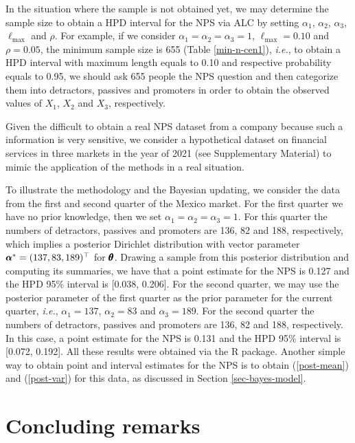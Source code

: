 \documentclass[12pt,a4paper]{article}%
\newcommand*{\bff}[1]{\ifmmode\pmb{#1}\else\textbf{#1}\fi}
\begin{document}
In the situation where the sample is not obtained yet, we may determine the sample size to obtain a HPD interval for the NPS via ALC by setting $\alpha_1$, $\alpha_2$, $\alpha_3$, $\ell_{\text{max}}$ and $\rho$. For example, if we consider $\alpha_1=\alpha_2=\alpha_3=1$, $\ell_{\text{max}}=0.10$ and $\rho=0.05$, the minimum sample size is 655 (Table \ref{min-n-cen1}), {\it i.e.}, to obtain a HPD interval with maximum length equals to 0.10 and respective probability equals to 0.95, we should ask 655 people the NPS question and then categorize them into detractors, passives and promoters in order to obtain the observed values of $X_1$, $X_2$ and $X_3$, respectively.

Given the difficult to obtain a real NPS dataset from a company because such a information is very sensitive, we consider a hypothetical dataset on financial services in three markets in the year of 2021 (see Supplementary Material) to mimic the application of the methods in a real situation.

To illustrate the methodology and the Bayesian updating, we consider the data from the first and second quarter of the Mexico market. For the first quarter we have no prior knowledge, then we set $\alpha_1=\alpha_2=\alpha_3=1$. For this quarter the numbers of detractors, passives and promoters are 136, 82 and 188, respectively, which implies a posterior Dirichlet distribution with vector parameter $\bff{\alpha}^*=(137, 83, 189)^\top$ for $\bff{\theta}$. Drawing a sample from this posterior distribution and computing its summaries, we have that a point estimate for the NPS is 0.127 and the HPD 95\% interval is [0.038, 0.206]. For the second quarter, we may use the posterior parameter of the first quarter as the prior parameter for the current quarter, {\it i.e.}, $\alpha_1=137$, $\alpha_2=83$ and $\alpha_3=189$. For the second quarter the numbers of detractors, passives and promoters are 136, 82 and 188, respectively. In this case, a point estimate for the NPS is 0.131 and the HPD 95\% interval is [0.072, 0.192]. All these results were obtained via the R package. Another simple way to obtain point and interval estimates for the NPS is to obtain (\ref{post-mean}) and (\ref{post-var}) for this data, as discussed in Section \ref{sec-bayes-model}.

\section{Concluding remarks}\label{sec-remarks}
\end{document}
